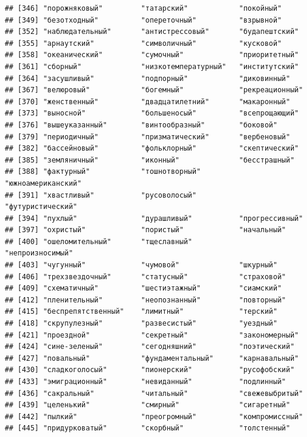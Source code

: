 \documentclass[11pt]{article}\usepackage[]{graphicx}\usepackage[]{color}
\makeatletter
\newenvironment{kframe}{%
 \def\at@end@of@kframe{}%
 \ifinner\ifhmode%
  \def\at@end@of@kframe{\end{minipage}}%
  \begin{minipage}{\columnwidth}%
 \fi\fi%
 \def\FrameCommand##1{\hskip\@totalleftmargin \hskip-\fboxsep
 \colorbox{shadecolor}{##1}\hskip-\fboxsep
     \hskip-\linewidth \hskip-\@totalleftmargin \hskip\columnwidth}%
 \MakeFramed {\advance\hsize-\width
   \@totalleftmargin\z@ \linewidth\hsize
   \@setminipage}}%
 {\par\unskip\endMakeFramed%
 \at@end@of@kframe}
\newenvironment{knitrout}{}{} %
\makeatother
\begin{document}
\begin{knitrout}
\begin{kframe}
\begin{verbatim}
## [346] "порожняковый"         "татарский"            "покойный"            
## [349] "безотходный"          "опереточный"          "взрывной"            
## [352] "наблюдательный"       "антистрессовый"       "будапештский"        
## [355] "арнаутский"           "символичный"          "кусковой"            
## [358] "океанический"         "сумочный"             "приоритетный"        
## [361] "сборный"              "низкотемпературный"   "институтский"        
## [364] "засушливый"           "подпорный"            "диковинный"          
## [367] "велюровый"            "богемный"             "рекреационный"       
## [370] "женственный"          "двадцатилетний"       "макаронный"          
## [373] "выносной"             "большеносый"          "всепрощающий"        
## [376] "вышеуказанный"        "винтообразный"        "боковой"             
## [379] "периодичный"          "призматический"       "вербеновый"          
## [382] "бассейновый"          "фольклорный"          "скептический"        
## [385] "земляничный"          "иконный"              "бесстрашный"         
## [388] "фактурный"            "тошнотворный"         "южноамериканский"    
## [391] "хвастливый"           "русоволосый"          "футуристический"     
## [394] "пухлый"               "дурашливый"           "прогрессивный"       
## [397] "охристый"             "пористый"             "начальный"           
## [400] "ошеломительный"       "тщеславный"           "непроизносимый"      
## [403] "чугунный"             "чумовой"              "шкурный"             
## [406] "трехзвездочный"       "статусный"            "страховой"           
## [409] "схематичный"          "шестиэтажный"         "сиамский"            
## [412] "пленительный"         "неопознанный"         "повторный"           
## [415] "беспрепятственный"    "лимитный"             "терский"             
## [418] "скрупулезный"         "развесистый"          "уездный"             
## [421] "проездной"            "секретный"            "закономерный"        
## [424] "сине-зеленый"         "сегодняшний"          "поэтический"         
## [427] "повальный"            "фундаментальный"      "карнавальный"        
## [430] "сладкоголосый"        "пионерский"           "русофобский"         
## [433] "эмиграционный"        "невиданный"           "подлинный"           
## [436] "сакральный"           "читальный"            "свежевыбритый"       
## [439] "целенький"            "смирный"              "сигаретный"          
## [442] "пылкий"               "преогромный"          "компромиссный"       
## [445] "придурковатый"        "скорбный"             "толстенный"          

\end{verbatim}
\end{kframe}
\end{knitrout}
\end{document}
